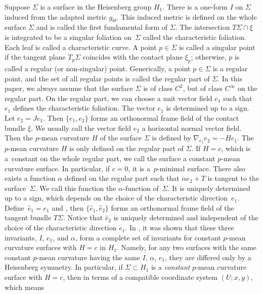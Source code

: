 \documentclass[10pt,a4paper]{amsart}
\numberwithin{equation}{section}
\begin{document}
Suppose $\Sigma$ is a surface in the Heisenberg group $H_{1}$. There is a one-form $I$ on $\Sigma$ induced from the adapted metric $g_{\Theta}$. This induced metric is defined on the whole surface $\Sigma$ and is called the first fundamental form of $\Sigma$. The intersection $T\Sigma\cap\xi$ is integrated to be a singular foliation on~$\Sigma$ called the characteristic foliation. Each leaf is called a characteristic curve. A point $p\in\Sigma$ is called a singular point if the tangent plane $T_{p}\Sigma$ coincides with the contact plane $\xi_{p}$; otherwise, $p$ is called a regular (or non-singular) point. Generically, a point $p\in\Sigma$ is a regular point, and the set of all regular points is called the regular part of $\Sigma$. In this paper, we always assume that the surface $\Sigma$ is of class $C^{2}$, but of class $C^{\infty}$ on the regular part.
On the regular part, we can choose a unit vector field $e_{1}$ such that $e_{1}$ defines the characteristic foliation. The vector $e_{1}$ is determined up to a sign. Let $e_{2}=Je_{1}$. Then $\{e_{1},e_{2}\}$ forms an orthonormal frame field of the contact bundle $\xi$. We usually call the vector field $e_{2}$ a horizontal normal vector field. Then the $p$-mean curvature $H$ of the surface $\Sigma$ is defined by
$
\nabla_{e_{1}}e_{2}=-He_{1}$.
The $p$-mean curvature $H$ is only defined on the regular part of $\Sigma$. If $H=c$, which is a~constant on the whole regular part, we call the surface a constant $p$-mean curvature surface. In particular, if $c=0$, it is a~$p$-minimal surface. There also exists a function $\alpha$ defined on the regular part such that $\alpha e_{2}+T$ is tangent to the surface~$\Sigma$. We call this function the $\alpha$-function of~$\Sigma$. It is uniquely determined up to a sign, which depends on the choice of the characteristic direction~$e_{1}$. Define~${\hat{e}_{1}=e_{1}}$ and , then $\{\hat{e}_{1},\hat{e}_{2}\}$ forms an orthonormal frame field of the tangent bundle $T\Sigma$. Notice that $\hat{e}_{2}$ is uniquely determined and independent of the choice of the characteristic direction $e_{1}$. In \cite{ChiuH/HuangY/LaiS:2017,ChiuH/LaiS:2015}, it was shown that these three invariants,
$I$, $e_{1}$, and $\alpha$,
form a complete set of invariants for constant $p$-mean curvature surfaces with $H=c$ in $H_{1}$. Namely, for any two surfaces with the same constant $p$-mean curvature having the same $I$, $\alpha$, $e_1$, they are differed only by a Heisenberg symmetry. In particular, if $\Sigma\subset H_{1}$ is a \emph{constant} $p$-mean curvature surface with $H=c$, then in terms of a compatible coordinate system $(U; x,y)$, which means
\end{document}
